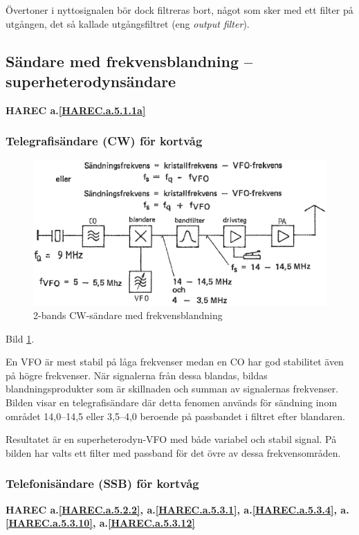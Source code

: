Övertoner i nyttosignalen bör dock filtreras bort, något som sker med ett
filter på utgången, det så kallade utgångsfiltret (eng \emph{output filter}).

\subsection{Sändare med frekvensblandning -- superheterodynsändare}
\textbf{HAREC a.\ref{HAREC.a.5.1.1a}\label{myHAREC.a.5.1.1a}}

\subsubsection{Telegrafisändare (CW) för kortvåg}

\begin{figure}
  \includegraphics[width=\textwidth]{images/cropped_pdfs/bild_2_5-04.pdf}
  \caption{2-bands CW-sändare med frekvensblandning}
  \label{fig:bildII5-4}
\end{figure}

Bild \ref{fig:bildII5-4}.

En VFO är mest stabil på låga frekvenser medan en CO har god
stabilitet även på högre frekvenser. När signalerna från dessa
blandas, bildas blandningsprodukter som är skillnaden och summan av
signalernas frekvenser. Bilden visar en telegrafisändare där detta
fenomen används för sändning inom området 14,0--14,5 eller 3,5--4,0
beroende på passbandet i filtret efter blandaren.

Resultatet är en superheterodyn-VFO med både variabel och stabil
signal. På bilden har valts ett filter med passband för det övre av
dessa frekvensområden.

\subsubsection{Telefonisändare (SSB) för kortvåg}
\textbf{
HAREC a.\ref{HAREC.a.5.2.2}\label{myHAREC.a.5.2.2},
 a.\ref{HAREC.a.5.3.1}\label{myHAREC.a.5.3.1},
 a.\ref{HAREC.a.5.3.4}\label{myHAREC.a.5.3.4},
 a.\ref{HAREC.a.5.3.10}\label{myHAREC.a.5.3.10},
 a.\ref{HAREC.a.5.3.12}\label{myHAREC.a.5.3.12}
}

